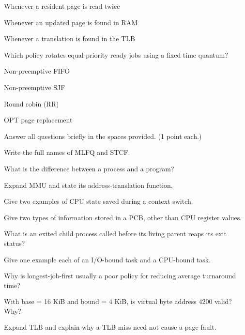 \begin{questions}
\begin{verticalchoices}
\item Whenever a resident page is read twice
\item Whenever an updated page is found in RAM
\item Whenever a translation is found in the TLB
\end{verticalchoices}
\question Which policy rotates equal-priority ready jobs using a fixed time quantum?
\begin{verticalchoices}
\item Non-preemptive FIFO
\item Non-preemptive SJF
\item Round robin (RR)
\item OPT page replacement
\end{verticalchoices}
\end{questions}\vfill\newpage
{}
\noindent Answer all questions briefly in the spaces provided. (1 point each.)\par\smallskip
\begin{questions}\setlength{\itemsep}{0.12cm}
\question Write the full names of MLFQ and STCF.\par\vspace{0.90cm}
\question What is the difference between a process and a program?\par\vspace{0.90cm}
\question Expand MMU and state its address-translation function.\par\vspace{0.90cm}
\question Give two examples of CPU state saved during a context switch.\par\vspace{0.90cm}
\question Give two types of information stored in a PCB, other than CPU register values.\par\vspace{0.90cm}
\question What is an exited child process called before its living parent reaps its exit status?\par\vspace{0.90cm}
\question Give one example each of an I/O-bound task and a CPU-bound task.\par\vspace{0.90cm}
\question Why is longest-job-first usually a poor policy for reducing average turnaround time?\par\vspace{0.90cm}
\question With base = 16 KiB and bound = 4 KiB, is virtual byte address 4200 valid? Why?\par\vspace{0.90cm}
\question Expand TLB and explain why a TLB miss need not cause a page fault.\par\vspace{0.90cm}
\end{questions}\vfill\newpage

